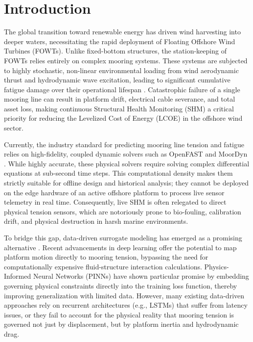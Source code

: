 \documentclass[preprint,12pt]{elsarticle}
\begin{document}
\section{Introduction}
\label{sec:intro}

The global transition toward renewable energy has driven wind harvesting into deeper waters, necessitating the rapid deployment of Floating Offshore Wind Turbines (FOWTs). Unlike fixed-bottom structures, the station-keeping of FOWTs relies entirely on complex mooring systems. These systems are subjected to highly stochastic, non-linear environmental loading from wind aerodynamic thrust and hydrodynamic wave excitation, leading to significant cumulative fatigue damage over their operational lifespan \cite{jonkman2009definition}. Catastrophic failure of a single mooring line can result in platform drift, electrical cable severance, and total asset loss, making continuous Structural Health Monitoring (SHM) a critical priority for reducing the Levelized Cost of Energy (LCOE) in the offshore wind sector.

Currently, the industry standard for predicting mooring line tension and fatigue relies on high-fidelity, coupled dynamic solvers such as OpenFAST \cite{jonkman2013openfast} and MoorDyn \cite{hall2015validation}. While highly accurate, these physical solvers require solving complex differential equations at sub-second time steps. This computational density makes them strictly suitable for offline design and historical analysis; they cannot be deployed on the edge hardware of an active offshore platform to process live sensor telemetry in real time. Consequently, live SHM is often relegated to direct physical tension sensors, which are notoriously prone to bio-fouling, calibration drift, and physical destruction in harsh marine environments.

To bridge this gap, data-driven surrogate modeling has emerged as a promising alternative \cite{li2022review}. Recent advancements in deep learning offer the potential to map platform motion directly to mooring tension, bypassing the need for computationally expensive fluid-structure interaction calculations. Physics-Informed Neural Networks (PINNs) \cite{raissi2019physics} have shown particular promise by embedding governing physical constraints directly into the training loss function, thereby improving generalization with limited data. However, many existing data-driven approaches rely on recurrent architectures (e.g., LSTMs) that suffer from latency issues, or they fail to account for the physical reality that mooring tension is governed not just by displacement, but by platform inertia and hydrodynamic drag.
\end{document}
